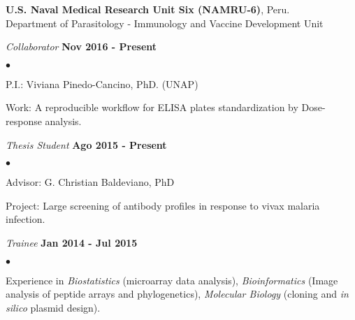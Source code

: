 \documentclass[margin,line]{res}
\newenvironment{list1}{
  \begin{list}{\ding{113}}{%
      \setlength{\itemsep}{0in}
      \setlength{\parsep}{0in} \setlength{\parskip}{0in}
      \setlength{\topsep}{0in} \setlength{\partopsep}{0in}
      \setlength{\leftmargin}{0.17in}}}{\end{list}}
\newenvironment{list2}{
  \begin{list}{$\bullet$}{%
      \setlength{\itemsep}{0in}
      \setlength{\parsep}{0in} \setlength{\parskip}{0in}
      \setlength{\topsep}{0in} \setlength{\partopsep}{0in}
      \setlength{\leftmargin}{0.2in}}}{\end{list}}
\begin{document}
\begin{resume}
{\bf U.S. Naval Medical Research Unit Six (NAMRU-6)}, Peru.\\
Department of Parasitology - Immunology and Vaccine Development Unit\\
\vspace*{-.1in}
\begin{list1}
	\item[] {\em Collaborator} \hfill {\bf Nov 2016 - Present}\\
	\vspace*{-.1in}
	\begin{list2} %
		\item P.I.: Viviana Pinedo-Cancino, PhD. (UNAP)
		\item Work: A reproducible workflow for ELISA plates standardization by Dose-response analysis.\\
	\end{list2}
	\item[] {\em Thesis Student} \hfill {\bf Ago 2015 - Present}\\
	\vspace*{-.1in}
	\begin{list2} %
		\item Advisor: G. Christian Baldeviano, PhD
		\item Project: Large screening of antibody profiles in response to vivax malaria infection.\\
	\end{list2}
	\vspace*{-.1in}
	\item[] {\em Trainee} \hfill {\bf Jan 2014 - Jul 2015}\\
	\vspace*{-.1in}
	\begin{list2} %
		\item Experience in \textit{Biostatistics} (microarray data analysis), \textit{Bioinformatics} (Image analysis of peptide arrays and phylogenetics), \textit{Molecular Biology} (cloning and \textit{in silico} plasmid design). %
	\end{list2}
\end{list1}


\end{resume}
\end{document}
